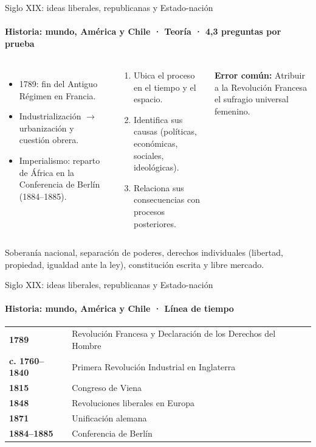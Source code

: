 \documentclass[aspectratio=169,11pt]{beamer}
\makeatletter
\newenvironment{lineatiempo}
  {\footnotesize\renewcommand{\arraystretch}{1.15}\begin{tabular}{@{}>{\leavevmode\bfseries\color{zinc700}}p{0.14\textwidth}p{0.74\textwidth}@{}}}
  {\end{tabular}}
\newlength{\ajustealto}
\newenvironment{ajustar}[1][0.74\textheight]
  {\setlength{\ajustealto}{#1}\begin{lrbox}{\ajustecaja}\begin{minipage}{\textwidth}}
  {\end{minipage}\end{lrbox}%
   \ifdim\dimexpr\ht\ajustecaja+\dp\ajustecaja\relax>\ajustealto
     \resizebox*{!}{\ajustealto}{\usebox{\ajustecaja}}\else\usebox{\ajustecaja}\fi}
\makeatother
\begin{document}
\begin{frame}{Siglo XIX: ideas liberales, republicanas y Estado-nación}
\label{tema-hi-revoluciones}
\framesubtitle{Historia: mundo, América y Chile · Teoría · 4,3 preguntas por prueba}
\begin{ajustar}
\begin{columns}[T,onlytextwidth]
\begin{itemize}\footnotesize
\item 1789: fin del Antiguo Régimen en Francia.
\item Industrialización $\rightarrow$ urbanización y cuestión obrera.
\item Imperialismo: reparto de África en la Conferencia de Berlín (1884–1885).
\end{itemize}
\begin{cajaregla}\scriptsize \begin{enumerate}\item Ubica el proceso en el tiempo y el espacio.\item Identifica sus causas (políticas, económicas, sociales, ideológicas).\item Relaciona sus consecuencias con procesos posteriores.\end{enumerate}\end{cajaregla}
\begin{notagris}\scriptsize \textbf{Error común:} Atribuir a la Revolución Francesa el sufragio universal femenino.\end{notagris}
\end{columns}
\begin{cajaclave}\footnotesize
Soberanía nacional, separación de poderes, derechos individuales (libertad, propiedad, igualdad ante la ley), constitución escrita y libre mercado.
\end{cajaclave}
\end{ajustar}
\end{frame}

\begin{frame}{Siglo XIX: ideas liberales, republicanas y Estado-nación}
\framesubtitle{Historia: mundo, América y Chile · Línea de tiempo}
\begin{lineatiempo}
1789 & Revolución Francesa y Declaración de los Derechos del Hombre \\
c. 1760–1840 & Primera Revolución Industrial en Inglaterra \\
1815 & Congreso de Viena \\
1848 & Revoluciones liberales en Europa \\
1871 & Unificación alemana \\
1884–1885 & Conferencia de Berlín \\
\end{lineatiempo}
\end{frame}
\end{document}
